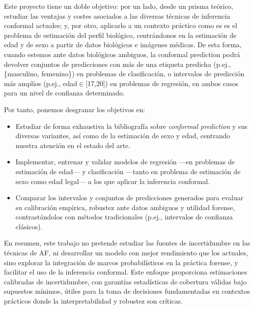 
Este proyecto tiene un doble objetivo: por un lado, desde un prisma teórico, estudiar las ventajas y costes asociados a 
las diversas técnicas de inferencia conformal actuales; y, por otro, aplicarlo a un contexto práctico como es es el 
problema de estimación del perfil biológico, centrándonos en la estimación de edad y de sexo a partir de datos biológicos
e imágenes médicas. De esta forma, cuando estemos ante datos biológicos ambiguos, la conformal prediction podrá devolver 
conjuntos de predicciones con más de una etiqueta predicha (p.ej., \{masculino, femenino\}) en problemas de clasificación, 
o intervalos de predicción más amplios (p.ej., edad$\in$[17,20]) en problemas de regresión, en ambos casos para un 
nivel de confianza determinado.

Por tanto, ponemos desgranar los objetivos en:

\begin{itemize}

    \item Estudiar de forma exhaustiva la bibliografía sobre \textit{conformal prediction} y sus diversas variantes, así
          como de la estimación de sexo y edad, centrando nuestra atención en el estado del arte.

    \item Implementar, entrenar y validar modelos de regresión ---en problemas de estimación de edad--- y clasificación 
    ---tanto en problema de estimación de sexo como edad legal--- a los que aplicar la inferencia conformal.

    \item Comparar los intervalos y conjuntos de predicciones generados para evaluar su calibración empírica, robustez 
    ante datos ambiguos y utilidad forense, contrastándolos con métodos tradicionales (p.ej., intervalos de confianza 
    clásicos).  



\end{itemize}


En resumen, este trabajo no pretende estudiar las fuentes de incertidumbre en las técnicas de AF, ni desarrollar un 
modelo con mejor rendimiento que los actuales, sino explorar la integración de marcos probabilísticos en la práctica 
forense, y facilitar el uso de la inferencia conformal. 
Este enfoque proporciona estimaciones calibradas de incertidumbre, con garantías estadísticas de cobertura válidas 
bajo supuestos mínimos, útiles para la toma de decisiones fundamentadas en contextos prácticos 
donde la interpretabilidad y robustez son críticas.


